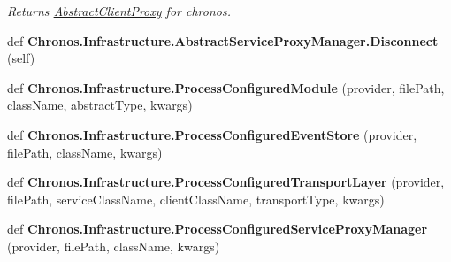 \begin{DoxyCompactItemize}
\begin{DoxyCompactList}\small\item\em Returns \hyperlink{classChronos_1_1Infrastructure_1_1AbstractClientProxy}{Abstract\+Client\+Proxy} for chronos. \end{DoxyCompactList}\item 
def {\bfseries Chronos.\+Infrastructure.\+Abstract\+Service\+Proxy\+Manager.\+Disconnect} (self)\hypertarget{group__Chronos_ga7edcabfc4153d4259f95cb2b31a4c593}{}\label{group__Chronos_ga7edcabfc4153d4259f95cb2b31a4c593}

\item 
def {\bfseries Chronos.\+Infrastructure.\+Process\+Configured\+Module} (provider, file\+Path, class\+Name, abstract\+Type, kwargs)\hypertarget{group__Chronos_ga79941ba3d28ec83a1ac85e21c52c8e1a}{}\label{group__Chronos_ga79941ba3d28ec83a1ac85e21c52c8e1a}

\item 
def {\bfseries Chronos.\+Infrastructure.\+Process\+Configured\+Event\+Store} (provider, file\+Path, class\+Name, kwargs)\hypertarget{group__Chronos_ga0f34d85491b226ea24982253a263676c}{}\label{group__Chronos_ga0f34d85491b226ea24982253a263676c}

\item 
def {\bfseries Chronos.\+Infrastructure.\+Process\+Configured\+Transport\+Layer} (provider, file\+Path, service\+Class\+Name, client\+Class\+Name, transport\+Type, kwargs)\hypertarget{group__Chronos_ga145e62a1ec711fa09f2802ff500919e5}{}\label{group__Chronos_ga145e62a1ec711fa09f2802ff500919e5}

\item 
def {\bfseries Chronos.\+Infrastructure.\+Process\+Configured\+Service\+Proxy\+Manager} (provider, file\+Path, class\+Name, kwargs)\hypertarget{group__Chronos_ga07e3cecfb19066b207ea5ebb383c2044}{}\label{group__Chronos_ga07e3cecfb19066b207ea5ebb383c2044}


\end{DoxyCompactItemize}
